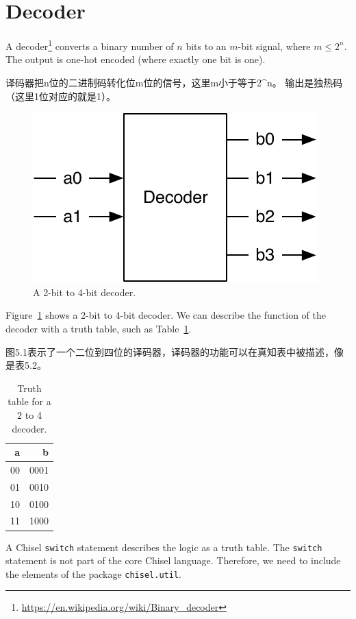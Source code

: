 \documentclass[%
    10pt,
    headinclude, footexclude,
    openright, %
    notitlepage,
    cleardoubleempty,
    headsepline,
    pointlessnumbers,
    bibtotoc, idxtotoc,
    ]{scrbook}
\newcommand{\code}[1]{{\small{\texttt{#1}}}}
\newcommand{\scale}{0.7}
\newcommand{\myref}[2]{\href{#1}{#2}}
\renewcommand{\myref}[2]{{#2}{\footnote{\url{#1}}}}
\begin{document}
\section{Decoder}

A \myref{https://en.wikipedia.org/wiki/Binary_decoder}{decoder}
converts a binary number of $n$ bits to an $m$-bit signal, where $m \leq 2^n$.
The output is one-hot encoded (where exactly one bit is one).


译码器把n位的二进制码转化位m位的信号，这里m小于等于2^n。
输出是独热码（这里1位对应的就是1）。

\begin{figure}
  \centering
  \includegraphics[scale=\scale]{figures/decoder}
  \caption{A 2-bit to 4-bit decoder.}
  \label{fig:decoder}
\end{figure}

Figure~\ref{fig:decoder} shows a 2-bit to 4-bit decoder. We can describe the function
of the decoder with a truth table, such as Table~\ref{tab:decoder}.

图5.1表示了一个二位到四位的译码器，译码器的功能可以在真知表中被描述，像是表5.2。

\begin{table}
 \centering
 \label{tab:decoder}
  \begin{tabular}{rr}
    \toprule
    a & b \\
    \midrule
    00 & 0001 \\
    01 & 0010 \\
    10 & 0100 \\
    11 & 1000 \\
    \bottomrule 
  \end{tabular} 
  \caption{Truth table for a 2 to 4 decoder.}
\end{table}

A Chisel \code{switch} statement describes the logic as a truth table.
The \code{switch} statement is not part of the core Chisel language.
Therefore, we need to include the elements of the package \code{chisel.util}.
\end{document}
